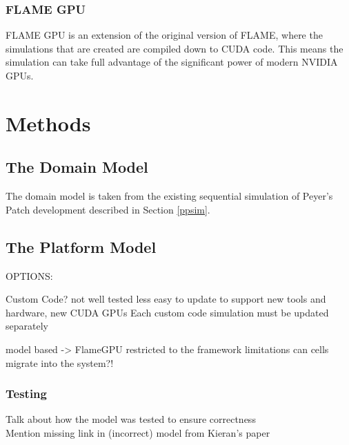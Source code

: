 \documentclass{UoYCSproject}
\begin{document}
\subsection{FLAME GPU}
FLAME GPU is an extension of the original version of FLAME, where the simulations that are created are compiled down to CUDA code. This means the simulation can take full advantage of the significant power of modern NVIDIA GPUs.




\chapter{Methods}
\label{methods}
\section{The Domain Model}
The domain model is taken from the existing sequential simulation of Peyer's Patch development described in Section \ref{ppsim}.

\section{The Platform Model}
OPTIONS:

Custom Code?\cite{phil_diss}
	not well tested
	less easy to update to support new tools and hardware, new CUDA GPUs
		Each custom code simulation must be updated separately


model based -> FlameGPU\cite{flame_keratinocyte}
	restricted to the framework limitations
		can cells migrate into the system?!

\subsection{Testing}
Talk about how the model was tested to ensure correctness\\
Mention missing link in (incorrect) model from Kieran's paper 
\end{document}
